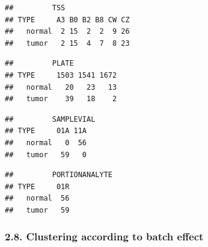 \documentclass[]{article}
\newenvironment{Shaded}{\begin{snugshade}}{\end{snugshade}}
\newcommand{\KeywordTok}[1]{\textcolor[rgb]{0.13,0.29,0.53}{\textbf{{#1}}}}
\newcommand{\DataTypeTok}[1]{\textcolor[rgb]{0.13,0.29,0.53}{{#1}}}
\newcommand{\NormalTok}[1]{{#1}}
\begin{document}
\begin{verbatim}
##         TSS
## TYPE     A3 B0 B2 B8 CW CZ
##   normal  2 15  2  2  9 26
##   tumor   2 15  4  7  8 23
\end{verbatim}

\begin{Shaded}
\end{Shaded}

\begin{verbatim}
##         PLATE
## TYPE     1503 1541 1672
##   normal   20   23   13
##   tumor    39   18    2
\end{verbatim}

\begin{Shaded}
\end{Shaded}

\begin{verbatim}
##         SAMPLEVIAL
## TYPE     01A 11A
##   normal   0  56
##   tumor   59   0
\end{verbatim}

\begin{Shaded}
\end{Shaded}

\begin{verbatim}
##         PORTIONANALYTE
## TYPE     01R
##   normal  56
##   tumor   59
\end{verbatim}

\subsubsection{2.8. Clustering according to batch
effect}\label{clustering-according-to-batch-effect}
\end{document}
